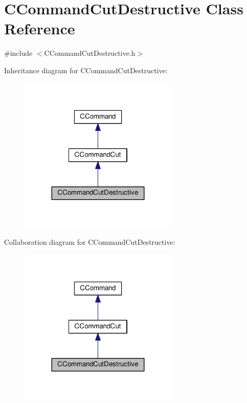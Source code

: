 \hypertarget{classCCommandCutDestructive}{}\section{C\+Command\+Cut\+Destructive Class Reference}
\label{classCCommandCutDestructive}


{\ttfamily \#include $<$C\+Command\+Cut\+Destructive.\+h$>$}



Inheritance diagram for C\+Command\+Cut\+Destructive\+:\nopagebreak
\begin{figure}[H]
\begin{center}
\leavevmode
\includegraphics[width=215pt]{classCCommandCutDestructive__inherit__graph}
\end{center}
\end{figure}


Collaboration diagram for C\+Command\+Cut\+Destructive\+:\nopagebreak
\begin{figure}[H]
\begin{center}
\leavevmode
\includegraphics[width=215pt]{classCCommandCutDestructive__coll__graph}
\end{center}
\end{figure}
